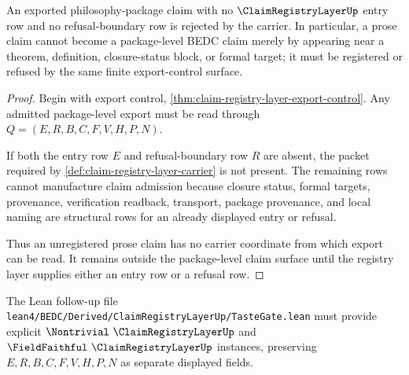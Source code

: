 \begin{theorem}
\label{thm:claim-registry-layer-no-unregistered-export}
An exported philosophy-package claim with no $\ClaimRegistryLayerUp$ entry row and no refusal-boundary row is rejected by the carrier. In particular, a prose claim cannot become a package-level BEDC claim merely by appearing near a theorem, definition, closure-status block, or formal target; it must be registered or refused by the same finite export-control surface.
\end{theorem}
\begin{proof}
Begin with export control, \autoref{thm:claim-registry-layer-export-control}. Any admitted package-level export must be read through $Q=(E,R,B,C,F,V,H,P,N)$.

If both the entry row $E$ and refusal-boundary row $R$ are absent, the packet required by \autoref{def:claim-registry-layer-carrier} is not present. The remaining rows cannot manufacture claim admission because closure status, formal targets, provenance, verification readback, transport, package provenance, and local naming are structural rows for an already displayed entry or refusal.

Thus an unregistered prose claim has no carrier coordinate from which export can be read. It remains outside the package-level claim surface until the registry layer supplies either an entry row or a refusal row.
\end{proof}

The Lean follow-up file \texttt{lean4/BEDC/Derived/ClaimRegistryLayerUp/TasteGate.lean} must provide explicit $\Nontrivial\ \ClaimRegistryLayerUp$ and $\FieldFaithful\ \ClaimRegistryLayerUp$ instances, preserving $E,R,B,C,F,V,H,P,N$ as separate displayed fields.



